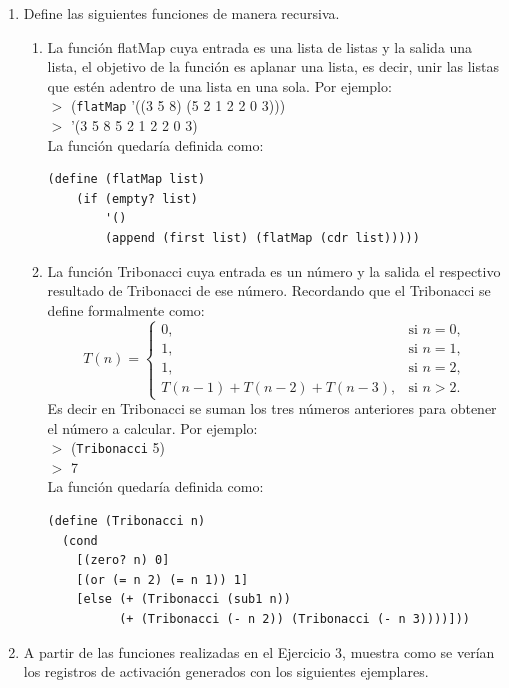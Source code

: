 \documentclass[11pt]{article}
\begin{document}
\begin{enumerate}[leftmargin=0.8cm]
    \item Define las siguientes funciones de manera recursiva.
    \begin{enumerate}
        \item La función flatMap cuya entrada es una lista de listas y la salida una lista, el objetivo de la función es aplanar una lista, es decir, unir las listas que estén adentro de una lista en una sola. Por ejemplo:\\
        $>$ (\texttt{flatMap} '((3 5 8) (5 2 1 2 2 0 3)))\\
        $>$ '(3 5 8 5 2 1 2 2 0 3)\\
        La función quedaría definida como:
        \begin{lstlisting}
(define (flatMap list)
    (if (empty? list)
        '()
        (append (first list) (flatMap (cdr list)))))
        \end{lstlisting}
        \item La función Tribonacci cuya entrada es un número y la salida el respectivo resultado de Tribonacci de ese número. Recordando que el Tribonacci se define formalmente como:
        \[
            T(n) = \left\{ \begin{array}{ll}
                0, & \text{si } n= 0,\\
                1, & \text{si } n= 1,\\
                1, & \text{si } n= 2,\\
                T(n-1) + T(n-2) + T(n-3), & \text{si } n > 2.
            \end{array}\right.
        \]
        Es decir en Tribonacci se suman los tres números anteriores para obtener el número a calcular. Por ejemplo:\\
        $>$ (\texttt{Tribonacci} 5)\\
        $>$ 7\\
        La función quedaría definida como:
        \begin{lstlisting}
(define (Tribonacci n)
  (cond
    [(zero? n) 0]
    [(or (= n 2) (= n 1)) 1]
    [else (+ (Tribonacci (sub1 n)) 
          (+ (Tribonacci (- n 2)) (Tribonacci (- n 3))))]))
        \end{lstlisting}
    \end{enumerate}
    \newpage
    \item A partir de las funciones realizadas en el Ejercicio 3, muestra como se verían los registros de activación generados con los siguientes ejemplares.
    \begin{enumerate}

\end{enumerate}
\end{enumerate}
\end{document}
